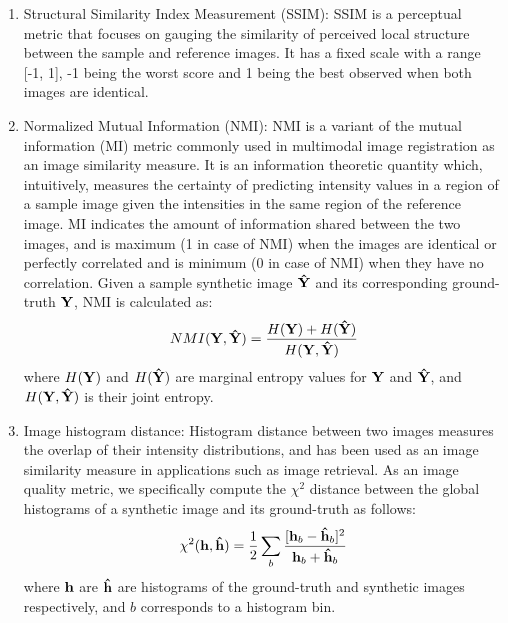 \begin{enumerate}
    
    \item Structural Similarity Index Measurement (SSIM): SSIM \cite{wang2004image} is a perceptual metric that focuses on gauging the similarity of perceived local structure between the sample and reference images. It has a fixed scale with a range [-1, 1], -1 being the worst score and 1 being the best observed when both images are identical.
    
    \item Normalized Mutual Information (NMI): NMI \cite{studholme1999overlap} is a variant of the mutual information (MI) metric commonly used in multimodal image registration as an image similarity measure. It is an information theoretic quantity which, intuitively, measures the certainty of predicting intensity values in a region of a sample image given the intensities in the same region of the reference image. MI indicates the amount of information shared between the two images, and is maximum (1 in case of NMI) when the images are identical or perfectly correlated and is minimum (0 in case of NMI) when they have no correlation. Given a sample synthetic image $\vb{\hat{Y}}$ and its corresponding ground-truth $\vb{Y}$, NMI is calculated as: 
    \begin{equation}
        NMI(\vb{Y}, \vb{\hat{Y}}) = \frac{H(\vb{Y}) + H(\vb{\hat{Y}})}{H(\vb{Y}, \vb{\hat{Y}})}
        \label{eq:metric_nmi}
    \end{equation}
    where $H(\vb{Y})$ and $H(\vb{\hat{Y}})$ are marginal entropy values for $\vb{Y}$  and $\vb{\hat{Y}}$, and $H(\vb{Y}, \vb{\hat{Y}})$ is their joint entropy.
    
    \item Image histogram distance: Histogram distance between two images measures the overlap of their intensity distributions, and has been used as an image similarity measure in applications such as image retrieval. As an image quality metric, we specifically compute the $\chi^2$ distance between the global histograms of a synthetic image and its ground-truth as follows: 
    \begin{equation}
        \chi^2(\vb{h}, \vb{\hat{h}}) = \frac{1}{2} \sum_{b} \frac{[\vb{h}_b - \vb{\hat{h}}_b]^2}{\vb{h}_b + \vb{\hat{h}}_b}
        \label{eq:metric_histogram}
    \end{equation}
    where $\vb{h}$ are $\vb{\hat{h}}$ are histograms of the ground-truth and synthetic images respectively, and $b$ corresponds to a histogram bin.
    
\end{enumerate}

